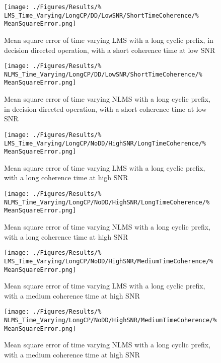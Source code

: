\begin{figure}[ht]
	\begin{minipage}{0.49\textwidth}
		\centering
		\texttt{[image: ./Figures/Results/\%
	LMS\_Time\_Varying/LongCP/DD/LowSNR/ShortTimeCoherence/\%
	MeanSquareError.png]}
		\captionsetup{width=0.75\linewidth}
		\caption{Mean square error of time varying LMS with a 
		long cyclic prefix, in decision directed operation,
		with a short coherence time at low SNR}
	\end{minipage}
	\begin{minipage}{0.49\textwidth}
		\texttt{[image: ./Figures/Results/\%
	NLMS\_Time\_Varying/LongCP/DD/LowSNR/ShortTimeCoherence/\%
	MeanSquareError.png]}
		\captionsetup{width=0.75\linewidth}
		\caption{Mean square error of time varying NLMS with 
		a long cyclic prefix, in decision directed operation,
		with a short coherence time at low SNR}
	\end{minipage}
\end{figure}

\begin{figure}[ht]
	\begin{minipage}{0.49\textwidth}
		\texttt{[image: ./Figures/Results/\%
	LMS\_Time\_Varying/LongCP/NoDD/HighSNR/LongTimeCoherence/\%
	MeanSquareError.png]}
		\captionsetup{width=0.75\linewidth}
		\caption{Mean square error of time varying LMS with a 
		long cyclic prefix, with a long coherence time at 
		high SNR}
	\end{minipage}
	\begin{minipage}{0.49\textwidth}
		\texttt{[image: ./Figures/Results/\%
	NLMS\_Time\_Varying/LongCP/NoDD/HighSNR/LongTimeCoherence/\%
	MeanSquareError.png]}
		\captionsetup{width=0.75\linewidth}
		\caption{Mean square error of time varying NLMS with 
		a long cyclic prefix, with a long coherence time at 
		high SNR}
	\end{minipage}
\end{figure}

\begin{figure}[ht]
	\begin{minipage}{0.49\textwidth}
		\texttt{[image: ./Figures/Results/\%
	LMS\_Time\_Varying/LongCP/NoDD/HighSNR/MediumTimeCoherence/\%
	MeanSquareError.png]}
		\captionsetup{width=0.75\linewidth}
		\caption{Mean square error of time varying LMS with a 
		long cyclic prefix, with a medium coherence time at 
		high SNR}
	\end{minipage}
	\begin{minipage}{0.49\textwidth}
		\texttt{[image: ./Figures/Results/\%
	NLMS\_Time\_Varying/LongCP/NoDD/HighSNR/MediumTimeCoherence/\%
	MeanSquareError.png]}
		\captionsetup{width=0.75\linewidth}
		\caption{Mean square error of time varying NLMS with 
		a long cyclic prefix, with a medium coherence time
		at high SNR}
	\end{minipage}
\end{figure}

